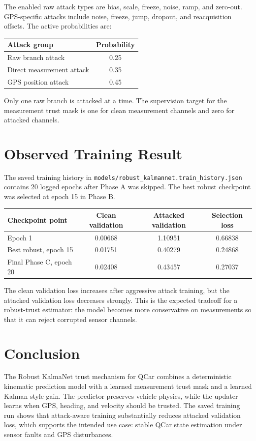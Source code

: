 \documentclass[11pt,a4paper]{article}
\begin{document}
The enabled raw attack types are bias, scale, freeze, noise, ramp, and zero-out.
GPS-specific attacks include noise, freeze, jump, dropout, and reacquisition
offsets. The active probabilities are:
\begin{center}
\begin{tabular}{lc}
\toprule
Attack group & Probability \\
\midrule
Raw branch attack & 0.25 \\
Direct measurement attack & 0.35 \\
GPS position attack & 0.45 \\
\bottomrule
\end{tabular}
\end{center}
Only one raw branch is attacked at a time. The supervision target for the
measurement trust mask is one for clean measurement channels and zero for
attacked channels.

\section{Observed Training Result}

The saved training history in \texttt{models/robust\_kalmannet.train\_history.json}
contains 20 logged epochs after Phase A was skipped. The best robust checkpoint
was selected at epoch 15 in Phase B.

\begin{center}
\begin{tabular}{lccc}
\toprule
Checkpoint point & Clean validation & Attacked validation & Selection loss \\
\midrule
Epoch 1 & 0.00668 & 1.10951 & 0.66838 \\
Best robust, epoch 15 & 0.01751 & 0.40279 & 0.24868 \\
Final Phase C, epoch 20 & 0.02408 & 0.43457 & 0.27037 \\
\bottomrule
\end{tabular}
\end{center}

The clean validation loss increases after aggressive attack training, but the
attacked validation loss decreases strongly. This is the expected tradeoff for a
robust-trust estimator: the model becomes more conservative on measurements so
that it can reject corrupted sensor channels.

\section{Conclusion}

The Robust KalmaNet trust mechanism for QCar combines a deterministic kinematic
prediction model with a learned measurement trust mask and a learned
Kalman-style gain. The predictor preserves vehicle physics, while the updater
learns when GPS, heading, and velocity should be trusted. The saved training run
shows that attack-aware training substantially reduces attacked validation loss,
which supports the intended use case: stable QCar state estimation under sensor
faults and GPS disturbances.
\end{document}
